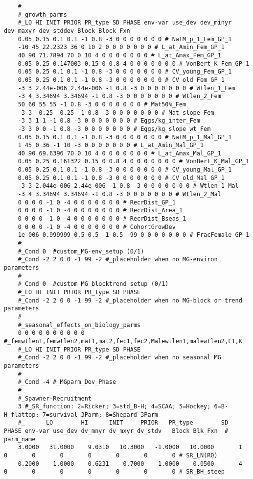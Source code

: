 \begin{landscape}
{\begin{verbatim}
	#
	#_growth_parms
	#_LO HI INIT PRIOR PR_type SD PHASE env-var use_dev dev_minyr dev_maxyr dev_stddev Block Block_Fxn
	0.05 0.15 0.1 0.1 -1 0.8 -3 0 0 0 0 0 0 0 # NatM_p_1_Fem_GP_1
	-10 45 22.2323 36 0 10 2 0 0 0 0 0 0 0 # L_at_Amin_Fem_GP_1
	40 90 71.7894 70 0 10 4 0 0 0 0 0 0 0 # L_at_Amax_Fem_GP_1
	0.05 0.25 0.147003 0.15 0 0.8 4 0 0 0 0 0 0 0 # VonBert_K_Fem_GP_1
	0.05 0.25 0.1 0.1 -1 0.8 -3 0 0 0 0 0 0 0 # CV_young_Fem_GP_1
	0.05 0.25 0.1 0.1 -1 0.8 -3 0 0 0 0 0 0 0 # CV_old_Fem_GP_1
	-3 3 2.44e-006 2.44e-006 -1 0.8 -3 0 0 0 0 0 0 0 # Wtlen_1_Fem
	-3 4 3.34694 3.34694 -1 0.8 -3 0 0 0 0 0 0 0 # Wtlen_2_Fem
	50 60 55 55 -1 0.8 -3 0 0 0 0 0 0 0 # Mat50%_Fem
	-3 3 -0.25 -0.25 -1 0.8 -3 0 0 0 0 0 0 0 # Mat_slope_Fem
	-3 3 1 1 -1 0.8 -3 0 0 0 0 0 0 0 # Eggs/kg_inter_Fem
	-3 3 0 0 -1 0.8 -3 0 0 0 0 0 0 0 # Eggs/kg_slope_wt_Fem
	0.05 0.15 0.1 0.1 -1 0.8 -3 0 0 0 0 0 0 0 # NatM_p_1_Mal_GP_1
	1 45 0 36 -1 10 -3 0 0 0 0 0 0 0 # L_at_Amin_Mal_GP_1
	40 90 69.6396 70 0 10 4 0 0 0 0 0 0 0 # L_at_Amax_Mal_GP_1
	0.05 0.25 0.161322 0.15 0 0.8 4 0 0 0 0 0 0 0 # VonBert_K_Mal_GP_1
	0.05 0.25 0.1 0.1 -1 0.8 -3 0 0 0 0 0 0 0 # CV_young_Mal_GP_1
	0.05 0.25 0.1 0.1 -1 0.8 -3 0 0 0 0 0 0 0 # CV_old_Mal_GP_1
	-3 3 2.044e-006 2.44e-006 -1 0.8 -3 0 0 0 0 0 0 0 # Wtlen_1_Mal
	-3 4 3.34694 3.34694 -1 0.8 -3 0 0 0 0 0 0 0 # Wtlen_2_Mal
	0 0 0 0 -1 0 -4 0 0 0 0 0 0 0 # RecrDist_GP_1
	0 0 0 0 -1 0 -4 0 0 0 0 0 0 0 # RecrDist_Area_1
	0 0 0 0 -1 0 -4 0 0 0 0 0 0 0 # RecrDist_Bseas_1
	0 0 0 0 -1 0 -4 0 0 0 0 0 0 0 # CohortGrowDev
	1e-006 0.999999 0.5 0.5 -1 0.5 -99 0 0 0 0 0 0 0 # FracFemale_GP_1
	#
	#_Cond 0  #custom_MG-env_setup (0/1)
	#_Cond -2 2 0 0 -1 99 -2 #_placeholder when no MG-environ parameters
	#
	#_Cond 0  #custom_MG_blocktrend_setup (0/1)
	#_LO HI INIT PRIOR PR_type SD PHASE
	#_Cond -2 2 0 0 -1 99 -2 #_placeholder when no MG-block or trend parameters
	#
	#_seasonal_effects_on_biology_parms
	0 0 0 0 0 0 0 0 0 0 #_femwtlen1,femwtlen2,mat1,mat2,fec1,fec2,Malewtlen1,malewtlen2,L1,K
	#_LO HI INIT PRIOR PR_type SD PHASE
	#_Cond -2 2 0 0 -1 99 -2 #_placeholder when no seasonal MG parameters
	#
	#_Cond -4 #_MGparm_Dev_Phase
	#
	#_Spawner-Recruitment
	3 #_SR_function: 2=Ricker; 3=std_B-H; 4=SCAA; 5=Hockey; 6=B-H_flattop; 7=survival_3Parm; 8=Shepard_3Parm
	#_      LO        HI      INIT     PRIOR   PR_type        SD   PHASE env-var use_dev dv_mnyr dv_mxyr dv_stdv   Block Blk_Fxn  #  parm_name
	3.0000   31.0000    9.0310   10.3000   -1.0000   10.0000       1       0       0       0       0       0       0       0 # SR_LN(R0)
	0.2000    1.0000    0.6231    0.7000    1.0000    0.0500       4       0       0       0       0       0       0       0 # SR_BH_steep

\end{verbatim}}
\end{landscape}
